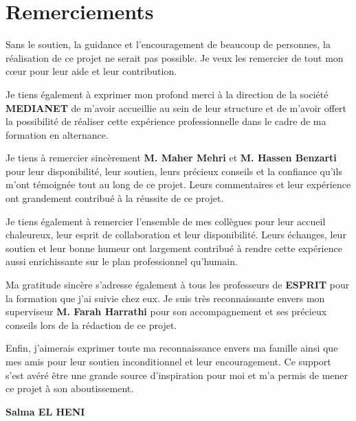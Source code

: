 \chapter*{Remerciements}

Sans le soutien, la guidance et l'encouragement de beaucoup de personnes, la réalisation de ce projet ne serait pas possible. Je veux les remercier de tout mon cœur pour leur aide et leur contribution.

\vspace{0.2cm}

Je tiens également à exprimer mon profond merci à la direction de la société \textbf{MEDIANET} de m'avoir accueillie au sein de leur structure et de m'avoir offert la possibilité de réaliser cette expérience professionnelle dans le cadre de ma formation en alternance.

\vspace{0.2cm}

Je tiens à remercier sincèrement \textbf{M. Maher Mehri} et \textbf{M. Hassen Benzarti} pour leur disponibilité, leur soutien, leurs précieux conseils et la confiance qu'ils m'ont témoignée tout au long de ce projet. Leurs commentaires et leur expérience ont grandement contribué à la réussite de ce projet.

\vspace{0.2cm}

Je tiens également à remercier l'ensemble de mes collègues pour leur accueil chaleureux, leur esprit de collaboration et leur disponibilité. Leurs échanges, leur soutien et leur bonne humeur ont largement contribué à rendre cette expérience aussi enrichissante sur le plan professionnel qu'humain.

\vspace{0.2cm}

Ma gratitude sincère s'adresse également à tous les professeurs de \textbf{ESPRIT} pour la formation que j'ai suivie chez eux. Je suis très reconnaissante envers mon superviseur \textbf{M. Farah Harrathi} pour son accompagnement et ses précieux conseils lors de la rédaction de ce projet.

\vspace{0.2cm}

Enfin, j'aimerais exprimer toute ma reconnaissance envers ma famille ainsi que mes amis pour leur soutien inconditionnel et leur encouragement. Ce support s'est avéré être une grande source d'inspiration pour moi et m'a permis de mener ce projet à son aboutissement.

\vspace{0.4cm}

\begin{flushright}
\textbf{Salma EL HENI}
\end{flushright}